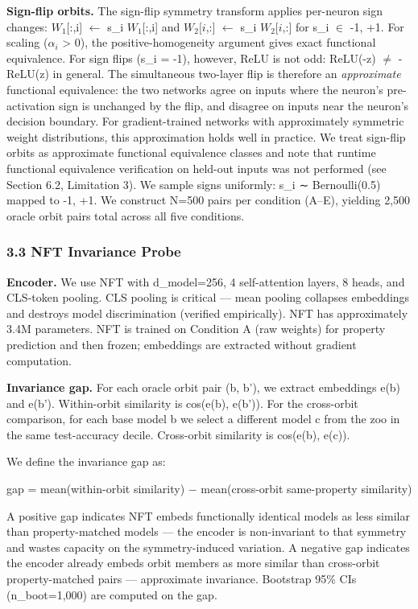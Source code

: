\textbf{Sign-flip orbits.} The sign-flip symmetry transform applies per-neuron sign changes: $W_{1}[$:,i] $\leftarrow$ s\_i $W_{1}[$:,i] and $W_{2}[i$,:] $\leftarrow$ s\_i $W_{2}[i$,:] for s\_i $\in$ {-1, +1}. For scaling ($\alpha _i$ > 0), the positive-homogeneity argument gives exact functional equivalence. For sign flips (s\_i = -1), however, ReLU is not odd: ReLU(-z) $\neq$ -ReLU(z) in general. The simultaneous two-layer flip is therefore an \textit{approximate} functional equivalence: the two networks agree on inputs where the neuron's pre-activation sign is unchanged by the flip, and disagree on inputs near the neuron's decision boundary. For gradient-trained networks with approximately symmetric weight distributions, this approximation holds well in practice. We treat sign-flip orbits as approximate functional equivalence classes and note that runtime functional equivalence verification on held-out inputs was not performed (see Section 6.2, Limitation 3). We sample signs uniformly: s\_i ∼ Bernoulli(0.5) mapped to {-1, +1}. We construct N=500 pairs per condition (A--E), yielding 2,500 oracle orbit pairs total across all five conditions.

\subsubsection{3.3 NFT Invariance Probe}

\textbf{Encoder.} We use NFT \citep{Zhou2023NeuralFunctionalNetworks} with d\_model=256, 4 self-attention layers, 8 heads, and CLS-token pooling. CLS pooling is critical --- mean pooling collapses embeddings and destroys model discrimination (verified empirically). NFT has approximately 3.4M parameters. NFT is trained on Condition A (raw weights) for property prediction and then frozen; embeddings are extracted without gradient computation.

\textbf{Invariance gap.} For each oracle orbit pair (b, b'), we extract embeddings e(b) and e(b'). Within-orbit similarity is cos(e(b), e(b')). For the cross-orbit comparison, for each base model b we select a different model c from the zoo in the same test-accuracy decile. Cross-orbit similarity is cos(e(b), e(c)).

We define the invariance gap as:

gap = mean(within-orbit similarity) $-$ mean(cross-orbit same-property similarity)

A positive gap indicates NFT embeds functionally identical models as less similar than property-matched models --- the encoder is non-invariant to that symmetry and wastes capacity on the symmetry-induced variation. A negative gap indicates the encoder already embeds orbit members as more similar than cross-orbit property-matched pairs --- approximate invariance. Bootstrap 95\% CIs (n\_boot=1,000) are computed on the gap.


